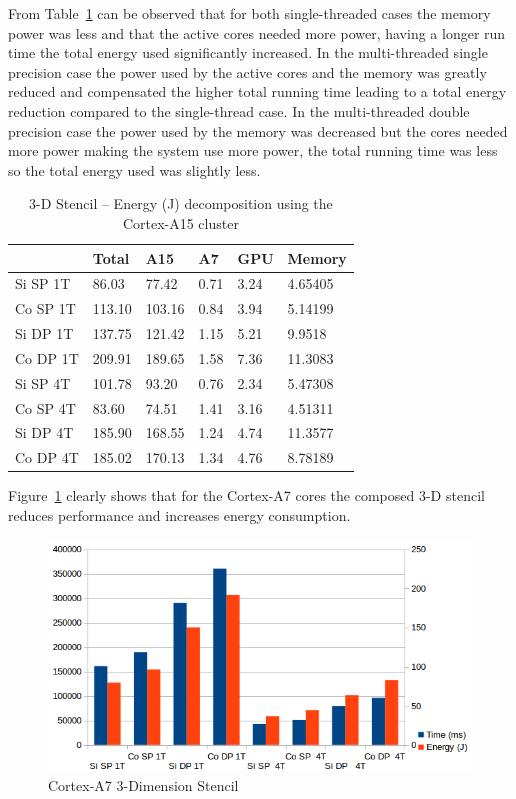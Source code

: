 \documentclass{acm_proc_article-sp}
\begin{document}
From Table~\ref{tbl:energy-A15-3D} can be observed that for both single-threaded cases the memory power was less and that the active cores needed more power, having a longer run time the total energy used significantly increased. In the multi-threaded single precision case the power used by the active cores and the memory was greatly reduced and compensated the higher total running time leading to a total energy reduction compared to the single-thread case. In the multi-threaded double precision case the power used by the memory was decreased but the cores needed more power making the system use more power, the total running time was less so the total energy used was slightly less.
\begin{table}[ht]
  \begin{center}
    \begin{tabular}{| l | l | l | l | l | l |}
      \hline
      & Total & A15 & A7 & GPU & Memory \\ \hline
      Si SP 1T & 86.03  & 77.42  & 0.71 & 3.24 & 4.65405 \\ \hline
      Co SP 1T & 113.10 & 103.16 & 0.84 & 3.94 & 5.14199 \\ \hline
      Si DP 1T & 137.75 & 121.42 & 1.15 & 5.21 & 9.9518  \\ \hline
      Co DP 1T & 209.91 & 189.65 & 1.58 & 7.36 & 11.3083 \\ \hline
      Si SP 4T & 101.78 & 93.20  & 0.76 & 2.34 & 5.47308 \\ \hline
      Co SP 4T & 83.60  & 74.51  & 1.41 & 3.16 & 4.51311 \\ \hline
      Si DP 4T & 185.90 & 168.55 & 1.24 & 4.74 & 11.3577 \\ \hline
      Co DP 4T & 185.02 & 170.13 & 1.34 & 4.76 & 8.78189 \\ \hline
    \end{tabular}
    \caption{3-D Stencil -- Energy (J) decomposition using the Cortex-A15 cluster}
    \label{tbl:energy-A15-3D}
  \end{center}
\end{table}


Figure~\ref{pic:A7-3d} clearly shows that for the Cortex-A7 cores the composed 3-D stencil reduces performance and increases energy consumption.
\begin{figure}[ht!]
  \centering
  \includegraphics[scale=0.5]{results/A7-3D}
  \caption{Cortex-A7 3-Dimension Stencil}
  \label{pic:A7-3d}
\end{figure}
\end{document}
